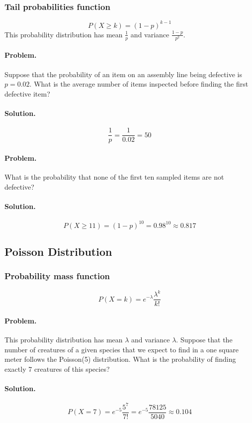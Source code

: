 \documentclass[oneside]{book}
\begin{document}
\subsubsection*{Tail probabilities function}
\[P(X \ge k) = (1 - p)^{k - 1}\]
This probability distribution has mean \(\frac{1}{p}\) and variance \(\frac{1 - p}{p^2}\).

\paragraph{Problem.}
Suppose that the probability of an item on an assembly
line being defective is \(p = 0.02\). What is the average number of items
inspected before finding the first defective item?
\paragraph{Solution.}
\[\frac{1}{p} = \frac{1}{0.02} = 50\]

\paragraph{Problem.}
What is the probability that none of the first ten sampled
items are not defective?
\paragraph{Solution.}
\[P(X \ge 11) = (1 - p)^{10} = 0.98^{10} \approx 0.817\]

\subsection{Poisson Distribution}
\subsubsection*{Probability mass function}
\[P(X = k) = e^{-\lambda}\frac{\lambda^k}{k!}\]

\paragraph{Problem.}
This probability distribution has mean \(\lambda\) and variance \(\lambda\).
Suppose that the number of creatures of a given species that we expect to find
in a one square meter follows the Poisson(5) distribution. What is the
probability of finding exactly 7 creatures of this species?
\paragraph{Solution.}
\[P(X = 7) = e^{-5}\frac{5^7}{7!} = e^{-5}\frac{78125}{5040} \approx 0.104\]
\end{document}
